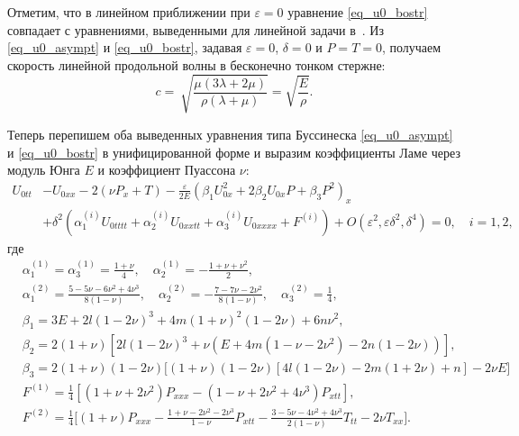 \documentclass[12pt, a4paper]{report}
\begin{document}
Отметим, что в линейном приближении при $\varepsilon = 0$ уравнение \eqref{eq_u0_bostr} совпадает с уравнениями, выведенными для линейной задачи в~\cite{bostrm2000}.
Из \eqref{eq_u0_asympt} и \eqref{eq_u0_bostr}, задавая $\varepsilon = 0$, $\delta = 0$ и $P = T = 0$, получаем скорость линейной продольной волны в бесконечно тонком стержне:
\begin{equation}
\label{lin_velocity}
c = \ \sqrt{\frac{\mu(3\lambda + 2\mu)}{\rho(\lambda+\mu)}} = \sqrt{\frac{E}{\rho}}.
\end{equation}

Теперь перепишем оба выведенных уравнения типа Буссинеска \eqref{eq_u0_asympt} и \eqref{eq_u0_bostr} в унифицированной форме и выразим коэффициенты Ламе через модуль Юнга $ E $ и коэффициент Пуассона $ \nu $:
\begin{equation}\label{eq_u0_fin}
\begin{split}
U_{0tt} &- U_{0xx} - 2\left(\nu P_{x} + T\right) - \frac{\varepsilon}{2 E} \left(\beta_1U_{0x}^2 + 2 \beta_2 U_{0x} P + \beta_3 P^2 \right)_x \\
&+ \delta^2 \left(\alpha_1^{(i)} U_{0tttt} + \alpha_2^{(i)} U_{0xxtt} + \alpha_3^{(i)} U_{0xxxx} + F^{(i)}\right) + O(\varepsilon^2, \varepsilon\delta^2, \delta^4) = 0, \quad i = 1,2,
\end{split}
\end{equation}
где
\begin{align}
\label{alpha_1}
&\alpha_1^{(1)} = \alpha_3^{(1)} = \frac{1 + \nu}{4}, \quad \alpha_2^{(1)} = -\frac{1 + \nu + \nu^2}{2}, \\
\label{alpha_2}
&\alpha_1^{(2)} = \frac{5 - 5\nu - 6\nu^2 + 4\nu^3}{8(1-\nu)},\quad \alpha_2^{(2)} = -\frac{7 - 7\nu - 2\nu^2}{8(1-\nu)}, \quad \alpha_3^{(2)} = \frac14,\\
\label{beta_1}
&\beta_1 = 3E + 2l(1 - 2\nu)^3 + 4m(1 + \nu)^2 (1 - 2\nu) + 6n\nu^2,\\
\label{beta_2}
&\beta_2 = 2 (1 + \nu) \left[2 l (1 - 2 \nu)^3 + \nu \left(E + 4m \left(1 - \nu - 2\nu^2\right) - 2n (1 - 2\nu)\right) \right],\\
\label{beta_3}
&\beta_3 = 2(1 + \nu)(1 - 2 \nu) \Big[ (1 + \nu)(1 - 2\nu) [4l \left(1 - 2\nu\right) - 2m(1 + 2\nu) + n] - 2\nu E \Big]\\
\label{F1}
&F^{(1)} = \frac{1}{4} \left[(1 + \nu + 2\nu^2) P_{xxx} - (1 - \nu + 2\nu^2 + 4\nu^3) P_{xtt}\right],\\
\label{F2}
&F^{(2)} = \frac{1}{4} \bigg[ (1 + \nu) P_{xxx} - \frac{1 + \nu - 2\nu^2 - 2\nu^3}{1 - \nu} P_{xtt} - \frac{3 - 5\nu - 4\nu^2 + 4\nu^3}{2(1 - \nu)} T_{tt} - 2\nu T_{xx}\bigg].
\end{align}
\end{document}
